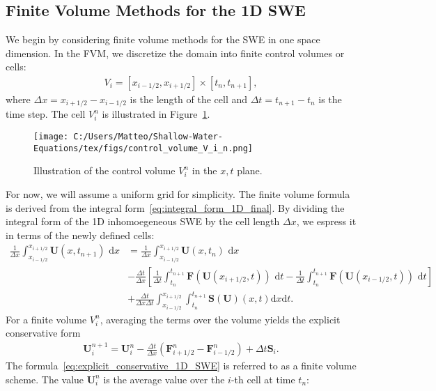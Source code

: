 \subsection{Finite Volume Methods for the 1D SWE}
We begin by considering finite volume methods for the SWE in one space dimension.
In the FVM, we discretize the domain into finite control volumes or cells:
\begin{align*}
    V_i = [x_{i-1/2}, x_{i+1/2}] \times [t_n, t_{n+1}],
\end{align*}
where $\Delta x = x_{i+1/2} - x_{i-1/2}$ is the length of the cell and $\Delta t = t_{n+1} - t_n$ is the time step.
The cell $V_i^n$ is illustrated in Figure~\ref{fig:control_volume_V_i_n}.
\begin{figure}[H]
    \centering
    \texttt{[image: C:/Users/Matteo/Shallow-Water-Equations/tex/figs/control\_volume\_V\_i\_n.png]}
    \caption{Illustration of the control volume $V_i^n$ in the $x,t$ plane.}\label{fig:control_volume_V_i_n}
\end{figure}
For now, we will assume a uniform grid for simplicity.
The finite volume formula is derived from the integral form~\eqref{eq:integral_form_1D_final}.
By dividing the integral form of the 1D inhomoegeneous SWE by the cell length $\Delta x$, we espress it in terms of the newly defined cells:
\begin{align*}
    \frac{1}{\Delta x} \int_{x_{i-1/2}}^{x_{i+1/2}} \mathbf{U}(x,t_{n+1}) \text{ d}x &= \frac{1}{\Delta x} \int_{x_{i-1/2}}^{x_{i+1/2}} \mathbf{U}(x,t_n) \text{ d}x\\
    & - \frac{\Delta t}{\Delta x} \left[ \frac{1}{\Delta t} \int_{t_n}^{t_{n+1}} \mathbf{F}(\mathbf{U}(x_{i+1/2}, t)) \text{ d}t
    - \frac{1}{\Delta t} \int_{t_n}^{t_{n+1}} \mathbf{F}(\mathbf{U}(x_{i-1/2}, t)) \text{ d}t \right] \\
    &+ \frac{\Delta t}{\Delta x \Delta t} \int_{x_{i-1/2}}^{x_{i+1/2}} \int_{t_n}^{t_{n+1}} \mathbf{S(U)}(x,t) \text{d}x \text{d}t.
\end{align*}
For a finite volume $V_i^n$, averaging the terms over the volume yields the explicit conservative form
\begin{align}\label{eq:explicit_conservative_1D_SWE}
    \mathbf{U}_i^{n+1} = \mathbf{U}_i^n - \frac{\Delta t}{\Delta x} \left( \mathbf{F}_{i+1/2}^n - \mathbf{F}_{i-1/2}^n \right) + \Delta t \mathbf{S}_i.
\end{align}
The formula~\eqref{eq:explicit_conservative_1D_SWE} is referred to as a finite volume scheme.
The value $\mathbf{U}_i^n$ is the average value over the $i$-th cell at time $t_n$:
